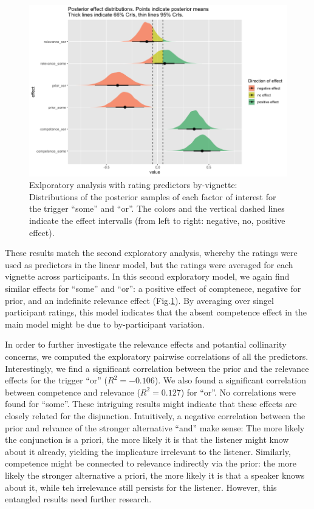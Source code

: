 \documentclass{sp}
\begin{document}
\begin{figure}[t]
	\begin{center}
		\includegraphics[width=1\linewidth]{images/posterior-effects-means.png}
	\end{center}
	\vspace{-0.3cm}
	\caption{Exlporatory analysis with rating predictors by-vignette: Distributions of the posterior samples of each factor of interest for the trigger ``some'' and ``or''. The colors and the vertical dashed lines indicate the effect intervalls (from left to right: negative, no, positive effect).}
	\label{posteriors-mean}
\end{figure}

These results match the second exploratory analysis, whereby the ratings were used as predictors in the linear model, but the ratings were averaged for each vignette across participants. In this second  exploratory model, we again find similar effects for ``some'' and ``or'': a positive effect of comptenece, negative for prior, and an indefinite relevance effect (Fig.\ref{posteriors-mean}). By averaging over singel participant ratings, this model indicates that the absent competence effect in the main model might be due to by-participant variation. 

In order to further investigate the relevance effects and potantial collinarity concerns, we computed the exploratory pairwise correlations of all the predictors. Interestingly, we find a significant correlation between the prior and the relevance effects for the trigger ``or'' ($R^2 = -0.106$). We also found a significant correlation between competence and relevance ($R^2 = 0.127$) for ``or''. No correlations were found for ``some''. These intriguing results might indicate that these effects are closely related for the disjunction. Intuitively, a negative correlation between the prior and relvance of the stronger alternative ``and'' make sense: The more likely the conjunction is a priori, the more likely it is that the listener might know about it already, yielding the implicature irrelevant to the listener. Similarly, competence might be connected to relevance indirectly via the prior: the more likely the stronger alternative a priori, the more likely it is that a speaker knows about it, while teh irrelevance still persists for the listener. However, this entangled results need further research. 
 
\end{document}
